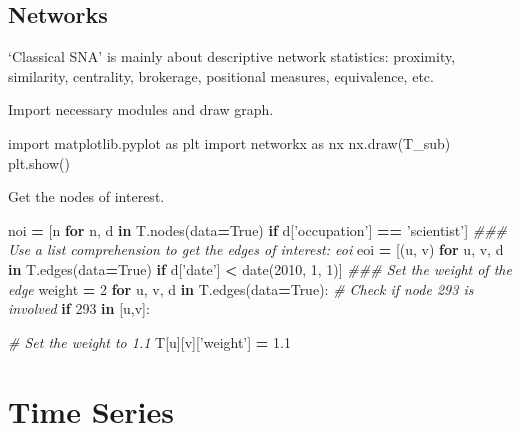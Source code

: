 \documentclass[]{book}
\newenvironment{Shaded}{\begin{snugshade}}{\end{snugshade}}
\newcommand{\KeywordTok}[1]{\textcolor[rgb]{0.13,0.29,0.53}{\textbf{#1}}}
\newcommand{\DecValTok}[1]{\textcolor[rgb]{0.00,0.00,0.81}{#1}}
\newcommand{\FloatTok}[1]{\textcolor[rgb]{0.00,0.00,0.81}{#1}}
\newcommand{\StringTok}[1]{\textcolor[rgb]{0.31,0.60,0.02}{#1}}
\newcommand{\ImportTok}[1]{#1}
\newcommand{\CommentTok}[1]{\textcolor[rgb]{0.56,0.35,0.01}{\textit{#1}}}
\newcommand{\VariableTok}[1]{\textcolor[rgb]{0.00,0.00,0.00}{#1}}
\newcommand{\ControlFlowTok}[1]{\textcolor[rgb]{0.13,0.29,0.53}{\textbf{#1}}}
\newcommand{\OperatorTok}[1]{\textcolor[rgb]{0.81,0.36,0.00}{\textbf{#1}}}
\newcommand{\NormalTok}[1]{#1}
\theoremstyle{definition}
\theoremstyle{definition}
\theoremstyle{definition}
\theoremstyle{remark}
\begin{document}
\section{Networks}\label{networks}

`Classical SNA' is mainly about descriptive network statistics:
proximity, similarity, centrality, brokerage, positional measures,
equivalence, etc.

Import necessary modules and draw graph.

\begin{Shaded}
\begin{Highlighting}[]
\ImportTok{import}\NormalTok{ matplotlib.pyplot }\ImportTok{as}\NormalTok{ plt}
\ImportTok{import}\NormalTok{ networkx }\ImportTok{as}\NormalTok{ nx}
\NormalTok{nx.draw(T_sub)}
\NormalTok{plt.show()}
\end{Highlighting}
\end{Shaded}

Get the nodes of interest.

\begin{Shaded}
\begin{Highlighting}[]
\NormalTok{noi }\OperatorTok{=}\NormalTok{ [n }\ControlFlowTok{for}\NormalTok{ n, d }\KeywordTok{in}\NormalTok{ T.nodes(data}\OperatorTok{=}\VariableTok{True}\NormalTok{) }\ControlFlowTok{if}\NormalTok{ d[}\StringTok{'occupation'}\NormalTok{] }\OperatorTok{==} \StringTok{'scientist'}\NormalTok{]}
\CommentTok{### Use a list comprehension to get the edges of interest: eoi}
\NormalTok{eoi }\OperatorTok{=}\NormalTok{ [(u, v) }\ControlFlowTok{for}\NormalTok{ u, v, d }\KeywordTok{in}\NormalTok{ T.edges(data}\OperatorTok{=}\VariableTok{True}\NormalTok{) }\ControlFlowTok{if}\NormalTok{ d[}\StringTok{'date'}\NormalTok{] }\OperatorTok{<}\NormalTok{ date(}\DecValTok{2010}\NormalTok{, }\DecValTok{1}\NormalTok{, }\DecValTok{1}\NormalTok{)]}
\CommentTok{### Set the weight of the edge}
\NormalTok{weight }\OperatorTok{=} \DecValTok{2}
\ControlFlowTok{for}\NormalTok{ u, v, d }\KeywordTok{in}\NormalTok{ T.edges(data}\OperatorTok{=}\VariableTok{True}\NormalTok{):}
  \CommentTok{# Check if node 293 is involved}
  \ControlFlowTok{if} \DecValTok{293} \KeywordTok{in}\NormalTok{ [u,v]:}
    
    \CommentTok{# Set the weight to 1.1}
\NormalTok{    T[u][v][}\StringTok{'weight'}\NormalTok{] }\OperatorTok{=} \FloatTok{1.1}
\end{Highlighting}
\end{Shaded}

\chapter{Time Series}\label{time-series}
\end{document}
